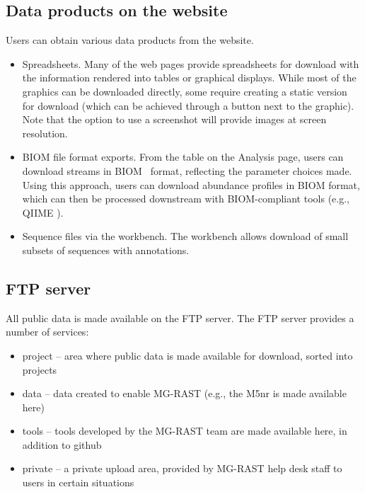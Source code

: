 \documentclass[12pt,fullpage]{report}
\begin{document}
\subsection{Data products on the website}

Users can obtain 
various data products from the website.
\begin{itemize}
\item
Spreadsheets.
Many of the web pages provide spreadsheets for download with the information rendered into tables or
graphical displays.
While most of the graphics can be downloaded directly, some require creating a static version for download (which can be achieved through a button next to the graphic).
Note that the option to use a screenshot will provide images at screen resolution.
\item
BIOM file format exports.
From the table on the Analysis page, users can download streams in BIOM~\cite{BIOM} format, reflecting the parameter choices made.
Using this approach, users can download abundance profiles in BIOM format, which can then be processed downstream with BIOM-compliant tools (e.g., QIIME \cite{QIIME}).
\item
Sequence files via the workbench.
The workbench allows download of small subsets of sequences with annotations.
\end{itemize}
\subsection{FTP server}

All public data is made available on the FTP server.
The FTP server provides a number of services:

\begin{itemize}
\item project --
area where public data is made available for download, sorted into projects

\item data --
data created to enable MG-RAST (e.g., the M5nr is made available here)

\item tools --
tools developed by the MG-RAST team are made available here, in addition to github

\item private --
a private upload area, provided by MG-RAST help desk staff to users in certain situations

\end{itemize}
\end{document}
